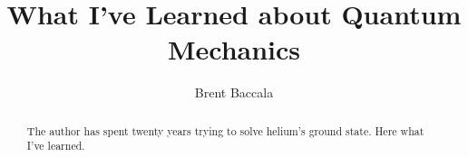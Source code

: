 \documentclass{article}
\title{What I've Learned about Quantum Mechanics}
\author{Brent Baccala}
\begin{document}
\parindent 0pt

\maketitle

\begin{abstract}
The author has spent twenty years trying to solve helium's ground state.
Here what I've learned.
\end{abstract}


\end{document}
